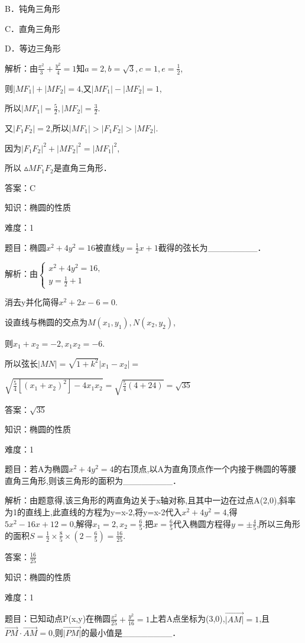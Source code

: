 \documentclass{article} %
\begin{document}
B．钝角三角形

C．直角三角形   

D．等边三角形

解析：由$\frac{x^2}{3}+\frac{y^2}{4}=1$知$a=2,b=\sqrt{3},c=1,e=\frac{1}{2}$,

则$|MF_1|+|MF_2|=4$,又$|MF_1|-|MF_2|=1$,

所以$|MF_1|=\frac{5}{2}, |MF_2|=\frac{3}{2}$.

又$|F_1F_2|=2$,所以$|MF_1|>|F_1F_2|>|MF_2|$.

因为$|F_1F_2|^2+|MF_2|^2=|MF_1|^2$,

所以 ${\vartriangle}MF_{1}F_{2}$是直角三角形．

答案：C

知识：椭圆的性质

难度：1

题目：椭圆$x^{2}+4y^{2}=16$被直线$y=\frac{1}{2}x+1$截得的弦长为\_\_\_\_\_\_\_\_．

解析：由$\left\{
\begin{array}{l}
x^2+4y^2=16, \\
y=\frac{1}{2}+1
\end{array}
\right.$

消去y并化简得$x^{2}+2x-6=0$.

设直线与椭圆的交点为$M(x_{1},y_{1}),N(x_{2},y_{2})$,

则$x_{1}+x_{2}=-2,x_{1}x_{2}=-6$.

所以弦长$|MN|=\sqrt{1+k^2}|x_1-x_2|=$

$\sqrt{\frac{5}{4}[(x_1+x_2)^2]-4x_1x_2}=\sqrt{\frac{5}{4}(4+24)}=\sqrt{35}$

答案：$\sqrt{35}$



知识：椭圆的性质

难度：1

题目：若A为椭圆$x^{2}+4y^{2}=4$的右顶点,以A为直角顶点作一个内接于椭圆的等腰直角三角形,则该三角形的面积为\_\_\_\_\_\_\_\_．

解析：由题意得,该三角形的两直角边关于x轴对称,且其中一边在过点A(2,0),斜率为1的直线上,此直线的方程为y=x-2,将y=x-2代入$x^{2}+4y^{2}=4$,得$5x^{2}-16x+12=0$,解得$x_{1}=2,x_{2}=\frac{6}{5}$.把$x=\frac{6}{5}$代入椭圆方程得$y={\pm}\frac{4}{5}$,所以三角形的面积$S=\frac{1}{2}{\times}\frac{8}{5}\times (2-\frac{6}{5})=\frac{16}{25}$.

答案：$\frac{16}{25}$

知识：椭圆的性质

难度：1

题目：已知动点P(x,y)在椭圆$\frac{x^2}{25}+\frac{y^2}{16}=1$上若A点坐标为(3,0),$\overrightarrow{|AM|}=1$,且$\overrightarrow{PM}\cdot \overrightarrow{AM}=0$,则$\overrightarrow{|PM|}$的最小值是\_\_\_\_\_\_\_\_．
\end{document}
